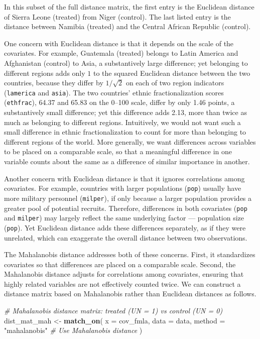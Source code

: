 \documentclass[
  12pt,
  leqno]{article}
\newenvironment{Shaded}{\begin{snugshade}}{\end{snugshade}}
\newcommand{\AttributeTok}[1]{\textcolor[rgb]{0.13,0.29,0.53}{#1}}
\newcommand{\CommentTok}[1]{\textcolor[rgb]{0.56,0.35,0.01}{\textit{#1}}}
\newcommand{\FunctionTok}[1]{\textcolor[rgb]{0.13,0.29,0.53}{\textbf{#1}}}
\newcommand{\NormalTok}[1]{#1}
\newcommand{\OtherTok}[1]{\textcolor[rgb]{0.56,0.35,0.01}{#1}}
\newcommand{\StringTok}[1]{\textcolor[rgb]{0.31,0.60,0.02}{#1}}
\begin{document}
\doublespacing

In this subset of the full distance matrix, the first entry is the
Euclidean distance of Sierra Leone (treated) from Niger (control). The
last listed entry is the distance between Namibia (treated) and the
Central African Republic (control).

One concern with Euclidean distance is that it depends on the scale of
the covariates. For example, Guatemala (treated) belongs to Latin
America and Afghanistan (control) to Asia, a substantively large
difference; yet belonging to different regions adds only \(1\) to the
squared Euclidean distance between the two countries, because they
differ by \(1/\sqrt{2}\) on each of two region indicators
(\texttt{lamerica} and \texttt{asia}). The two countries' ethnic
fractionalization scores (\texttt{ethfrac}), 64.37 and 65.83 on the
0--100 scale, differ by only 1.46 points, a substantively small
difference; yet this difference adds 2.13, more than twice as much as
belonging to different regions. Intuitively, we would not want such a
small difference in ethnic fractionalization to count for more than
belonging to different regions of the world. More generally, we want
differences across variables to be placed on a comparable scale, so that
a meaningful difference in one variable counts about the same as a
difference of similar importance in another.

Another concern with Euclidean distance is that it ignores correlations
among covariates. For example, countries with larger populations
(\texttt{pop}) usually have more military personnel (\texttt{milper}),
if only because a larger population provides a greater pool of potential
recruits. Therefore, differences in both covariates (\texttt{pop} and
\texttt{milper}) may largely reflect the same underlying factor ---
population size (\texttt{pop}). Yet Euclidean distance adds these
differences separately, as if they were unrelated, which can exaggerate
the overall distance between two observations.

The Mahalanobis distance \citep{mahalanobis1936} addresses both of these
concerns. First, it standardizes covariates so that differences are
placed on a comparable scale. Second, the Mahalanobis distance adjusts
for correlations among covariates, ensuring that highly related
variables are not effectively counted twice. We can construct a distance
matrix based on Mahalanobis rather than Euclidean distances as follows.

\singlespacing

\begin{Shaded}
\begin{Highlighting}[]
\CommentTok{\# Mahalanobis distance matrix: treated (UN = 1) vs control (UN = 0)}
\NormalTok{dist\_mat\_mah }\OtherTok{\textless{}{-}} \FunctionTok{match\_on}\NormalTok{(}
  \AttributeTok{x =}\NormalTok{ cov\_fmla,}
  \AttributeTok{data =}\NormalTok{ data,}
  \AttributeTok{method =} \StringTok{"mahalanobis"} \CommentTok{\# Use Mahalanobis distance}
\NormalTok{)}
\end{Highlighting}
\end{Shaded}
\end{document}
